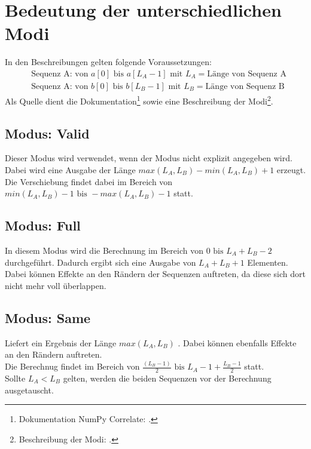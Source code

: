 \section{Bedeutung der unterschiedlichen Modi}
\begin{samepage}
  In den Beschreibungen gelten folgende Voraussetzungen: 
  \begin{align*}
    & \text{Sequenz A: von }a[0] \text{ bis }a[L_A - 1] \text{ mit } L_A = \text{Länge von Sequenz A}\\
    & \text{Sequenz A: von }b[0] \text{ bis }b[L_B - 1] \text{ mit } L_B = \text{Länge von Sequenz B}
  \end{align*}
  Als Quelle dient die Dokumentation\footnote{Dokumentation NumPy Correlate: \cite{DocumentationNumpyCorrelate}.} sowie eine Beschreibung der 
  Modi\footnote{Beschreibung der Modi: \cite{NumPyCorrelationModesExplained}.}.
\end{samepage}


\subsection{Modus: Valid}\label{sec:numpy_correlate_mode}
Dieser Modus wird verwendet, wenn der Modus nicht explizit angegeben wird.\\
Dabei wird eine Ausgabe der Länge $ max(L_A, L_B) - min(L_A, L_B) + 1 $ erzeugt. Die Verschiebung findet dabei im Bereich 
von $ min(L_A, L_B) - 1 \text{ bis } - max(L_A, L_B) - 1 $ statt.

\subsection{Modus: Full}
In diesem Modus wird die Berechnung im Bereich von $ 0 \text{ bis }  L_A + L_B - 2 $ durchgeführt. 
Dadurch ergibt sich eine Ausgabe von $ L_A + L_B + 1 $ Elementen. Dabei können Effekte an den Rändern der Sequenzen auftreten, da diese
sich dort nicht mehr voll überlappen.

\subsection{Modus: Same}
Liefert ein Ergebnis der Länge $ max(L_A, L_B) $ . Dabei können ebenfalls Effekte an den Rändern auftreten.\\
Die Berechnug findet im Bereich von $ \frac{(L_B - 1)}{2} \text{ bis } L_A - 1 + \frac{L_B - 1}{2} $ statt. \\
Sollte $ L_A < L_B $ gelten, werden die beiden Sequenzen vor der Berechnung ausgetauscht.










